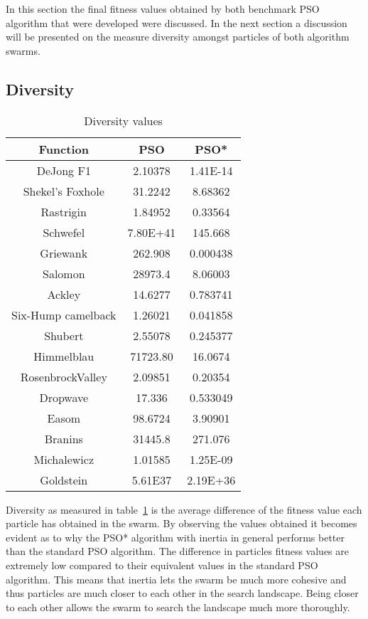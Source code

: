 In this section the final fitness values obtained by both benchmark PSO algorithm that were developed were discussed. In the next section a discussion will be presented on the measure diversity amongst particles of both algorithm swarms.
\subsection{Diversity}
\begin{table}[h]
\label{tbl:diversityValues}
\begin{center}
	\begin{tabular}{| c | c | c |}
	\hline
	Function & PSO & PSO*\\  \hline
	DeJong F1 & 2.10378 & 1.41E-14 \\ \hline
	Shekel's Foxhole & 31.2242 & 8.68362 \\ \hline
	Rastrigin & 1.84952 & 0.33564 \\ \hline
	Schwefel & 7.80E+41  & 145.668\\ \hline
	Griewank & 262.908 & 0.000438 \\ \hline
	Salomon & 28973.4  & 8.06003\\ \hline
	Ackley & 14.6277  & 0.783741\\ \hline
	Six-Hump camelback & 1.26021  & 0.041858\\ \hline
	Shubert & 2.55078  & 0.245377\\ \hline
	Himmelblau & 71723.80 & 16.0674\\ \hline
	RosenbrockValley & 2.09851  & 0.20354\\ \hline
	Dropwave & 17.336 & 0.533049\\ \hline
	Easom & 98.6724 & 3.90901\\ \hline
	Branins & 31445.8 & 271.076\\ \hline
	Michalewicz & 1.01585 & 1.25E-09\\ \hline
	Goldstein & 5.61E37 & 2.19E+36\\ \hline
	\end{tabular}
\end{center}
\caption{Diversity values}
\end{table}
Diversity as measured in table~\ref{tbl:diversityValues} is the average difference of the fitness value each particle has obtained in the swarm. By observing the values obtained it becomes evident as to why the PSO* algorithm with inertia in general performs better than the standard PSO algorithm. The difference in particles fitness values are extremely low compared to their equivalent values in the standard PSO algorithm. This means that inertia lets the swarm be much more cohesive and thus particles are much closer to each other in the search landscape. Being closer to each other allows the swarm to search the landscape much more thoroughly.

